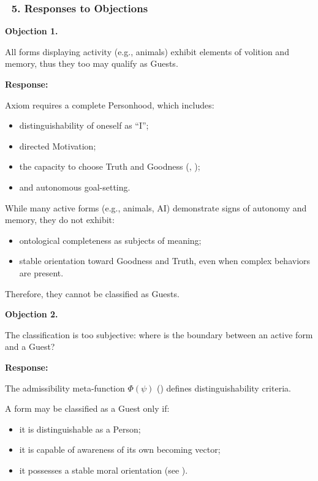 \documentclass[12pt]{article}
\begin{document}
\subsubsection*{🔹 5. Responses to Objections}

\textbf{Objection 1.}

All forms displaying activity (e.g., animals) exhibit elements of volition and memory, thus they too may qualify as Guests.

\textbf{Response:}

Axiom \text{[15.3]} requires a complete Personhood, which includes:

\begin{itemize}
\item distinguishability of oneself as ``I'';
\item directed Motivation;
\item the capacity to choose Truth and Goodness (\text{[11.2.1]}, \text{[11.3.1]});
\item and autonomous goal-setting.
\end{itemize}

While many active forms (e.g., animals, AI) demonstrate signs of autonomy and memory, they do not exhibit:

\begin{itemize}
\item ontological completeness as subjects of meaning;
\item stable orientation toward Goodness and Truth, even when complex behaviors are present.
\end{itemize}

Therefore, they cannot be classified as Guests.

\textbf{Objection 2.}

The classification is too subjective: where is the boundary between an active form and a Guest?

\textbf{Response:}

The admissibility meta-function $\Phi(\psi)$ (\text{[11.1.1]}) defines distinguishability criteria.

A form may be classified as a Guest only if:

\begin{itemize}
\item it is distinguishable as a Person;
\item it is capable of awareness of its own becoming vector;
\item it possesses a stable moral orientation (see \text{[27.2]}).
\end{itemize}
\end{document}
